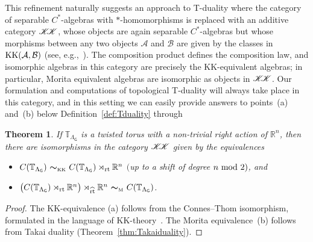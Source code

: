 \documentclass[pdftex]{sigma}
\numberwithin{equation}{section}
\newcommand{\mbf}[1]{{\boldsymbol {#1} }}
\newcommand{\CCK}{\mathscr{K}}
\newcommand{\sfG}{\mathsf{G}}
\newcommand{\rt}{{\rm rt}}
\newcommand{\real}{{\mathbb R}} %
\newcommand{\torus}{{\mathbb T}} %
\def\alg{{\mathcal A}}
\def\balg{{\mathcal B}}
\newtheorem{Theorem}{Theorem}[section]
\begin{document}
This refinement naturally
suggests an approach to T-duality where the category of separable
$C^*$-algebras with $*$-homomorphisms is replaced with an additive
category ${\CCK\hspace{-1mm}\CCK}$, whose objects are again separable $C^*$-algebras
but whose morphisms between any two objects $\alg$ and $\balg$ are
given by the classes in ${\rm KK}(\alg,\balg)$ (see,
e.g.,~\cite{Brodzki2007}). The composition product defines the
composition law, and isomorphic algebras
in this category are precisely the KK-equivalent
algebras; in particular, Morita equivalent algebras are isomorphic
as objects in ${\CCK\hspace{-1mm}\CCK}$. Our formulation and computations of topological
T-duality will always take place in this category, and in this
setting we can easily provide answers to points~(a) and~(b) below Definition~\ref{def:Tduality}
through
\begin{Theorem}\label{thm:equivalences}
If $\torus_{\Lambda_\sfG}$ is a twisted torus with a
non-trivial right action
of $\real^n$, then there are
isomorphisms in the category ${\CCK\hspace{-1mm}\CCK}$ given by the equivalences
\begin{itemize}\itemsep=0pt
\item[{\rm (a)}]  $C(\torus_{\Lambda_\sfG}) \
 \mbf\sim_{\text{\tiny{KK}}} \
 C(\torus_{\Lambda_\sfG})\rtimes_\rt\real^n  $ $($up to a shift of degree
 $n \ {\rm mod}~2)$, and
\item[{\rm (b)}]  $\big(C(\torus_{\Lambda_\sfG})\rtimes_\rt
 \real^n\big)\rtimes_{\widehat\rt} \real^n \ \mbf\sim_{\text{\tiny
 M}} \ C(\torus_{\Lambda_\sfG})$.
\end{itemize}
\end{Theorem}
\begin{proof}
The KK-equivalence (a) follows from the Connes--Thom isomorphism,
formulated in the language of KK-theory~\cite{Fack1981}. The Morita
equivalence~(b) follows from Takai duality
(Theorem~\ref{thm:Takaiduality}).
\end{proof}
\end{document}

